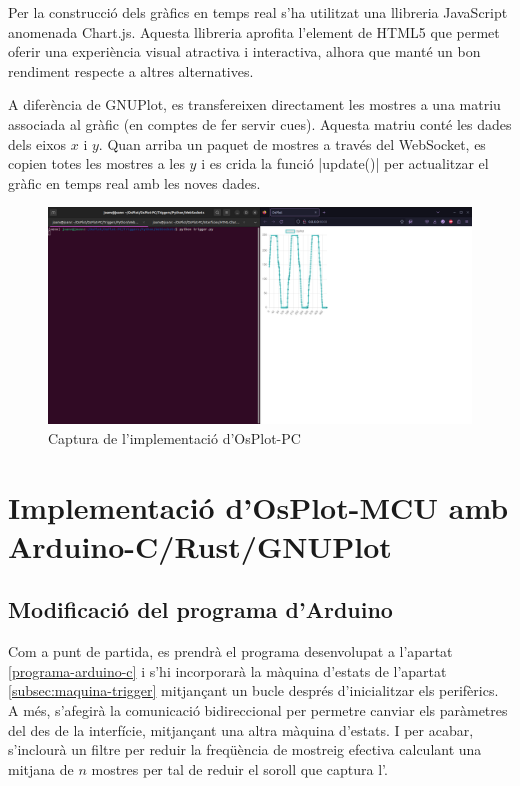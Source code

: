 \documentclass{tfgitic}[2023/06/30]
\begin{document}
Per la construcció dels gràfics en temps real s'ha utilitzat una
llibreria JavaScript anomenada Chart.js. Aquesta llibreria aprofita
l'element  de HTML5 que permet oferir una experiència
visual atractiva i interactiva, alhora que manté un bon rendiment
respecte a altres alternatives.

A diferència de GNUPlot, es transfereixen directament les mostres a
una matriu associada al gràfic (en comptes de fer servir
cues). Aquesta matriu conté les dades dels eixos $x$ i $y$. Quan
arriba un paquet de mostres a través del WebSocket, es copien totes
les mostres a les $y$ i es crida la funció \ord|update()| per
actualitzar el gràfic en temps real amb les noves dades.

\begin{figure}[h]
  \centering \includegraphics[width=\textwidth]{imgs/OsPlot-PC.png}
  \caption{Captura de l'implementació d'OsPlot-PC}
\end{figure}

\chapter{Implementació d'OsPlot-MCU amb Arduino-C/Rust/GNUPlot}

\section{Modificació del programa d'Arduino}

Com a punt de partida, es prendrà el programa desenvolupat a l'apartat
\ref{programa-arduino-c} i s'hi incorporarà la màquina d'estats de
l'apartat \ref{subsec:maquina-trigger} mitjançant un bucle després
d'inicialitzar els perifèrics. A més, s'afegirà la comunicació
bidireccional per permetre canviar els paràmetres del 
des de la interfície, mitjançant una altra màquina d'estats. I per
acabar, s'inclourà un filtre per reduir la freqüència de mostreig
efectiva calculant una mitjana de $n$ mostres per tal de reduir el
soroll que captura l'.
\end{document}
